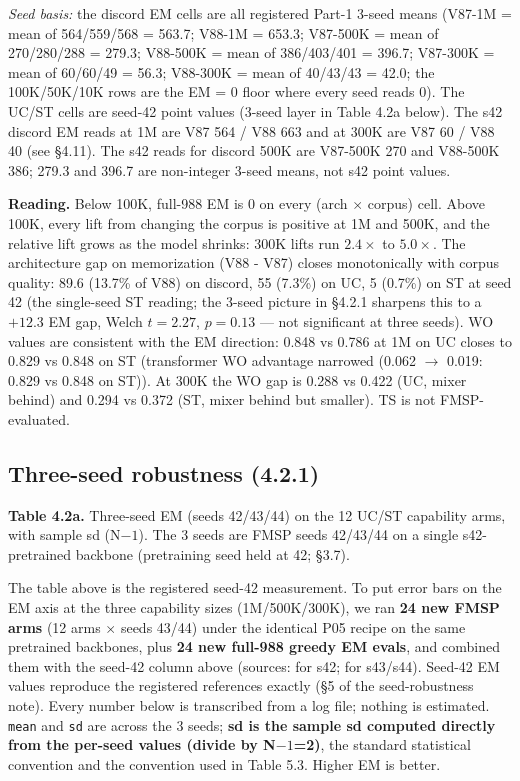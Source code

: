 \documentclass[11pt]{article}
\begin{document}
\emph{Seed basis:} the discord EM cells are all registered Part-1 3-seed means (V87-1M = mean of 564/559/568 = 563.7; V88-1M = 653.3; V87-500K = mean of 270/280/288 = 279.3; V88-500K = mean of 386/403/401 = 396.7; V87-300K = mean of 60/60/49 = 56.3; V88-300K = mean of 40/43/43 = 42.0; the 100K/50K/10K rows are the EM = 0 floor where every seed reads 0). The UC/ST cells are seed-42 point values (3-seed layer in Table 4.2a below). The s42 discord EM reads at 1M are V87 564 / V88 663 and at 300K are V87 60 / V88 40 (see \S4.11). The s42 reads for discord 500K are V87-500K 270 and V88-500K 386; 279.3 and 396.7 are non-integer 3-seed means, not s42 point values.

\textbf{Reading.} Below 100K, full-988 EM is 0 on every (arch $\times$ corpus) cell. Above 100K, every lift from changing the corpus is positive at 1M and 500K, and the relative lift grows as the model shrinks: 300K lifts run $2.4\times$ to $5.0\times$. The architecture gap on memorization (V88 - V87) closes monotonically with corpus quality: 89.6 (13.7\% of V88) on discord, 55 (7.3\%) on UC, 5 (0.7\%) on ST at seed 42 (the single-seed ST reading; the 3-seed picture in \S4.2.1 sharpens this to a $+12.3$ EM gap, Welch $t = 2.27$, $p = 0.13$ --- not significant at three seeds). WO values are consistent with the EM direction: 0.848 vs 0.786 at 1M on UC closes to 0.829 vs 0.848 on ST (transformer WO advantage narrowed (0.062 $\to$ 0.019: 0.829 vs 0.848 on ST)). At 300K the WO gap is 0.288 vs 0.422 (UC, mixer behind) and 0.294 vs 0.372 (ST, mixer behind but smaller). TS is not FMSP-evaluated.

\subsection{Three-seed robustness (4.2.1)}

\textbf{Table 4.2a.} Three-seed EM (seeds 42/43/44) on the 12 UC/ST capability arms, with sample sd (N$-1$). The 3 seeds are FMSP seeds 42/43/44 on a single s42-pretrained backbone (pretraining seed held at 42; \S3.7).

The table above is the registered seed-42 measurement. To put error bars on the EM axis at the three capability sizes (1M/500K/300K), we ran \textbf{24 new FMSP arms} (12 arms $\times$ seeds 43/44) under the identical P05 recipe on the same pretrained backbones, plus \textbf{24 new full-988 greedy EM evals}, and combined them with the seed-42 column above (sources:  for s42;  for s43/s44). Seed-42 EM values reproduce the registered references exactly (\S5 of the seed-robustness note). Every number below is transcribed from a log file; nothing is estimated. \texttt{mean} and \texttt{sd} are across the 3 seeds; \textbf{sd is the sample sd computed directly from the per-seed values (divide by N$-1$=2)}, the standard statistical convention and the convention used in Table 5.3. Higher EM is better.
\end{document}
